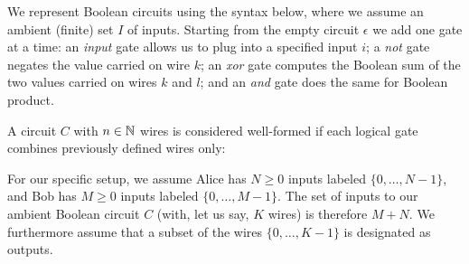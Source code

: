 We represent Boolean circuits using the syntax below, where we assume an ambient (finite) set $I$ of inputs. Starting from the empty circuit $\epsilon$ we add one gate at a time: an \emph{input} gate allows us to plug into a specified input $i$; a \emph{not} gate negates the value carried on wire $k$; an \emph{xor} gate computes the Boolean sum of the two values carried on wires $k$ and $l$; and an \emph{and} gate does the same for Boolean product.

\begin{syntax}

	
    \alternative{\epsilon}
\end{syntax}

\noindent A circuit $C$ with $n \in \mathbb{N}$ wires is considered well-formed if each logical gate combines previously defined wires only:


For our specific setup, we assume Alice has $N \geq 0$ inputs labeled $\{0,\ldots,N-1\}$, and Bob has $M \geq 0$ inputs labeled $\{0,\ldots,M-1\}$. The set of inputs to our ambient Boolean circuit $C$ (with, let us say, $K$ wires) is therefore $M + N$. We furthermore assume that a subset of the wires $\{0,\ldots,K-1\}$ is designated as outputs.


